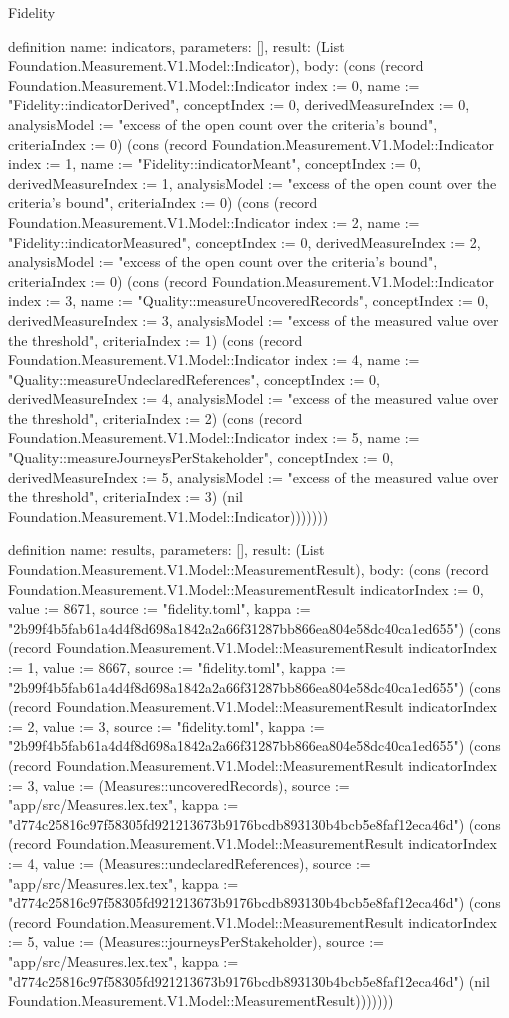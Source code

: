 \begin{lexlean}{Fidelity}
\begin{semanticmodule}
definition{
  name: indicators,
  parameters: [],
  result: (List Foundation.Measurement.V1.Model::Indicator),
  body: (cons (record Foundation.Measurement.V1.Model::Indicator {index := 0, name := "Fidelity::indicatorDerived", conceptIndex := 0, derivedMeasureIndex := 0, analysisModel := "excess of the open count over the criteria's bound", criteriaIndex := 0}) (cons (record Foundation.Measurement.V1.Model::Indicator {index := 1, name := "Fidelity::indicatorMeant", conceptIndex := 0, derivedMeasureIndex := 1, analysisModel := "excess of the open count over the criteria's bound", criteriaIndex := 0}) (cons (record Foundation.Measurement.V1.Model::Indicator {index := 2, name := "Fidelity::indicatorMeasured", conceptIndex := 0, derivedMeasureIndex := 2, analysisModel := "excess of the open count over the criteria's bound", criteriaIndex := 0}) (cons (record Foundation.Measurement.V1.Model::Indicator {index := 3, name := "Quality::measureUncoveredRecords", conceptIndex := 0, derivedMeasureIndex := 3, analysisModel := "excess of the measured value over the threshold", criteriaIndex := 1}) (cons (record Foundation.Measurement.V1.Model::Indicator {index := 4, name := "Quality::measureUndeclaredReferences", conceptIndex := 0, derivedMeasureIndex := 4, analysisModel := "excess of the measured value over the threshold", criteriaIndex := 2}) (cons (record Foundation.Measurement.V1.Model::Indicator {index := 5, name := "Quality::measureJourneysPerStakeholder", conceptIndex := 0, derivedMeasureIndex := 5, analysisModel := "excess of the measured value over the threshold", criteriaIndex := 3}) (nil Foundation.Measurement.V1.Model::Indicator)))))))
}

definition{
  name: results,
  parameters: [],
  result: (List Foundation.Measurement.V1.Model::MeasurementResult),
  body: (cons (record Foundation.Measurement.V1.Model::MeasurementResult {indicatorIndex := 0, value := 8671, source := "fidelity.toml", kappa := "2b99f4b5fab61a4d4f8d698a1842a2a66f31287bb866ea804e58dc40ca1ed655"}) (cons (record Foundation.Measurement.V1.Model::MeasurementResult {indicatorIndex := 1, value := 8667, source := "fidelity.toml", kappa := "2b99f4b5fab61a4d4f8d698a1842a2a66f31287bb866ea804e58dc40ca1ed655"}) (cons (record Foundation.Measurement.V1.Model::MeasurementResult {indicatorIndex := 2, value := 3, source := "fidelity.toml", kappa := "2b99f4b5fab61a4d4f8d698a1842a2a66f31287bb866ea804e58dc40ca1ed655"}) (cons (record Foundation.Measurement.V1.Model::MeasurementResult {indicatorIndex := 3, value := (Measures::uncoveredRecords), source := "app/src/Measures.lex.tex", kappa := "d774c25816c97f58305fd921213673b9176bcdb893130b4bcb5e8faf12eca46d"}) (cons (record Foundation.Measurement.V1.Model::MeasurementResult {indicatorIndex := 4, value := (Measures::undeclaredReferences), source := "app/src/Measures.lex.tex", kappa := "d774c25816c97f58305fd921213673b9176bcdb893130b4bcb5e8faf12eca46d"}) (cons (record Foundation.Measurement.V1.Model::MeasurementResult {indicatorIndex := 5, value := (Measures::journeysPerStakeholder), source := "app/src/Measures.lex.tex", kappa := "d774c25816c97f58305fd921213673b9176bcdb893130b4bcb5e8faf12eca46d"}) (nil Foundation.Measurement.V1.Model::MeasurementResult)))))))
}


\end{semanticmodule}
\end{lexlean}

